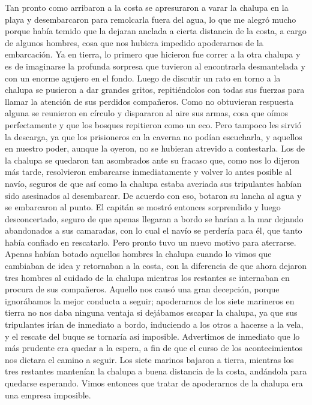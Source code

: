 \documentclass{novela}
\begin{document}
    Tan pronto como arribaron a la costa se apresuraron a varar la chalupa en la playa y desembarcaron para remolcarla fuera del agua, lo que me alegró mucho porque había temido que la dejaran anclada a cierta distancia de la costa, a cargo de algunos hombres, cosa que nos hubiera impedido apoderarnos de la embarcación.
    Ya en tierra, lo primero que hicieron fue correr a la otra chalupa y es de imaginarse la profunda sorpresa que tuvieron al encontrarla desmantelada y con un enorme agujero en el fondo.
    Luego de discutir un rato en torno a la chalupa se pusieron a dar grandes gritos, repitiéndolos con todas sus fuerzas para llamar la atención de sus perdidos compañeros. Como no obtuvieran respuesta alguna se reunieron en círculo y dispararon al aire sus armas, cosa que oímos perfectamente y que los bosques repitieron como un eco. Pero tampoco les sirvió la descarga, ya que los prisioneros en la caverna no podían escucharla, y aquellos en nuestro poder, aunque la oyeron, no se hubieran atrevido a contestarla.
    Los de la chalupa se quedaron tan asombrados ante su fracaso que, como nos lo dijeron más tarde, resolvieron embarcarse inmediatamente y volver lo antes posible al navío, seguros de que así como la chalupa estaba averiada sus tripulantes habían sido asesinados al desembarcar. De acuerdo con eso, botaron su lancha al agua y se embarcaron al punto.
    El capitán se mostró entonces sorprendido y luego desconcertado, seguro de que apenas llegaran a bordo se harían a la mar dejando abandonados a sus camaradas, con lo cual el navío se perdería para él, que tanto había confiado en rescatarlo.
    Pero pronto tuvo un nuevo motivo para aterrarse. Apenas habían botado aquellos hombres la chalupa cuando lo vimos que cambiaban de idea y retornaban a la costa, con la diferencia de que ahora dejaron tres hombres al cuidado de la chalupa mientras los restantes se internaban en procura de sus compañeros.
    Aquello nos causó una gran decepción, porque ignorábamos la mejor conducta a seguir; apoderarnos de los siete marineros en tierra no nos daba ninguna ventaja si dejábamos escapar la chalupa, ya que sus tripulantes irían de inmediato a bordo, induciendo a los otros a hacerse a la vela, y el rescate del buque se tornaría así imposible. Advertimos de inmediato que lo más prudente era quedar a la espera, a fin de que el curso de los acontecimientos nos dictara el camino a seguir. Los siete marinos bajaron a tierra, mientras los tres restantes mantenían la chalupa a buena distancia de la costa, andándola para quedarse esperando.
    Vimos entonces que tratar de apoderarnos de la chalupa era una empresa imposible.
\end{document}
